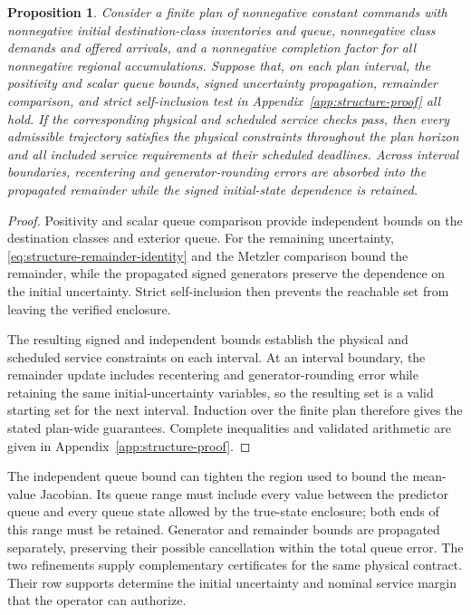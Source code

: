 \documentclass[journal,10pt]{IEEEtran}
\newtheorem{proposition}{Proposition}
\newcommand{\appref}[1]{Appendix~\ref{#1}}
\begin{document}
\begin{proposition}
\label{prop:structure-plan}
Consider a finite plan of nonnegative constant commands with nonnegative
initial destination-class inventories and queue, nonnegative class demands and
offered arrivals, and a nonnegative completion factor for all nonnegative
regional accumulations. Suppose that, on each plan interval, the positivity
and scalar queue bounds, signed uncertainty propagation, remainder comparison,
and strict self-inclusion test in \appref{app:structure-proof} all hold. If the
corresponding physical and scheduled service checks pass, then every admissible
trajectory satisfies the physical constraints throughout the plan horizon and
all included service requirements at their scheduled deadlines. Across
interval boundaries, recentering and generator-rounding errors are absorbed
into the propagated remainder while the signed initial-state dependence is
retained.
\end{proposition}

\begin{proof}
Positivity and scalar queue comparison provide independent bounds on the
destination classes and exterior queue. For the remaining uncertainty,
\eqref{eq:structure-remainder-identity} and the Metzler comparison bound the
remainder, while the propagated signed generators preserve the dependence on
the initial uncertainty. Strict self-inclusion then prevents the reachable
set from leaving the verified enclosure.

The resulting signed and independent bounds establish the physical and
scheduled service constraints on each interval. At an interval boundary, the
remainder update includes recentering and generator-rounding error while
retaining the same initial-uncertainty variables, so the resulting set is a
valid starting set for the next interval. Induction over the finite plan
therefore gives the stated plan-wide guarantees. Complete inequalities and
validated arithmetic are given in \appref{app:structure-proof}.
\end{proof}

The independent queue bound can tighten the region used to bound the
mean-value Jacobian. Its queue range must include every value between the
predictor queue and every queue state allowed by the true-state enclosure;
both ends of this range must be retained. Generator and remainder bounds
are propagated separately, preserving their possible cancellation within the
total queue error. The two refinements supply complementary certificates
for the same physical contract. Their row supports determine the initial
uncertainty and nominal service margin that the operator can authorize.
\end{document}
